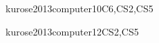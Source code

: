 \begin{syllabus}
\begin{unit}{\NCReliableDataDelivery}{}{kurose2013computer}{10}{C6,CS2,CS5}
\begin{topics}%
    \item \NCReliableDataDeliveryTopicError
    \item \NCReliableDataDeliveryTopicFlow
    \item \NCReliableDataDeliveryTopicPerformance
    \item \NCReliableDataDeliveryTopicTcp
\end{topics}
\begin{learningoutcomes}
	\item \NCReliableDataDeliveryLODescribeTheReliable [\Familiarity]
	\item \NCReliableDataDeliveryLOListTheAffect [\Familiarity]
	\item \NCReliableDataDeliveryLODesignAndSimple [\Usage]
\end{learningoutcomes}
\end{unit}

\begin{unit}{\NCRoutingandForwarding}{}{kurose2013computer}{12}{CS2,CS5}
\begin{topics}%
    \item \NCRoutingandForwardingTopicRouting
    \item \NCRoutingandForwardingTopicStatic
    \item \NCRoutingandForwardingTopicInternet
    \item \NCRoutingandForwardingTopicScalability
\end{topics}
\begin{learningoutcomes}
	\item \NCRoutingandForwardingLODescribeTheThe [\Familiarity]
	\item \NCRoutingandForwardingLODescribeHowForwarded [\Familiarity]
	\item \NCRoutingandForwardingLOListTheOf [\Familiarity]
\end{learningoutcomes}
\end{unit}


\end{syllabus}

